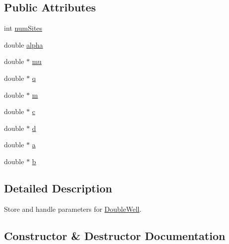 \subsection*{Public Attributes}
\begin{DoxyCompactItemize}
\item 
int \hyperlink{class_p_c_a_1_1_double_well_1_1_param_a7eec05c2eaffdf4dca9bd8a2c6ef0e79}{num\+Sites}
\item 
double \hyperlink{class_p_c_a_1_1_double_well_1_1_param_aaaa04b33180f32a53b04cd9687ca8232}{alpha}
\item 
double $\ast$ \hyperlink{class_p_c_a_1_1_double_well_1_1_param_a13ed4bc4bb0d5dea03d9bf1c2fa32e23}{mu}
\item 
double $\ast$ \hyperlink{class_p_c_a_1_1_double_well_1_1_param_a5d2ba876bef9280235a85a5b348f0fe0}{q}
\item 
double $\ast$ \hyperlink{class_p_c_a_1_1_double_well_1_1_param_a8e41ddd462a8fb9626b501bcf55009b0}{m}
\item 
double $\ast$ \hyperlink{class_p_c_a_1_1_double_well_1_1_param_aaafd8023dfa3860636feef19ff6edcb3}{c}
\item 
double $\ast$ \hyperlink{class_p_c_a_1_1_double_well_1_1_param_ad8db426aa01de2a57485a0b89b955ec6}{d}
\item 
double $\ast$ \hyperlink{class_p_c_a_1_1_double_well_1_1_param_a793aa698d3bcc8923a1e802727ce1b41}{a}
\item 
double $\ast$ \hyperlink{class_p_c_a_1_1_double_well_1_1_param_a8df8adab4f4b0d10b8dbfdb1db094167}{b}
\end{DoxyCompactItemize}


\subsection{Detailed Description}
Store and handle parameters for \hyperlink{class_p_c_a_1_1_double_well}{Double\+Well}. 



\subsection{Constructor \& Destructor Documentation}
\hypertarget{class_p_c_a_1_1_double_well_1_1_param_a412abf38a6dd3dc886415d16dde03fb4}{}\label{class_p_c_a_1_1_double_well_1_1_param_a412abf38a6dd3dc886415d16dde03fb4} 
